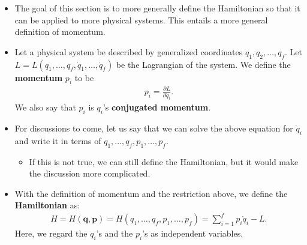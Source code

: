 \documentclass[10pt]{article}
\newcommand{\ve}[1]{\mathbf{#1}}
\begin{document}
  \begin{itemize}
    \item The goal of this section is to more generally define the Hamiltonian so that it can be applied to more physical systems. This entails a more general definition of momentum.    

    \item Let a physical system be described by generalized coordinates $q_1, q_2, \dotsc, q_f$. Let $L = L(q_1, \dotsc, q_f, \dot{q}_1, \dotsc, \dot{q}_f)$ be the Lagrangian of the system. We define the {\bf momentum} $p_i$ to be
    \begin{align} \label{momentum-def}
      p_i = \frac{\partial L}{\partial \dot{q}_i}.    
    \end{align}
    We also say that $p_i$ is $q_i$'s {\bf conjugated momentum}.

    \item For discussions to come, let us say that we can solve the above equation for $\dot{q}_i$ and write it in terms of $q_1, \dotsc, q_f, p_1, \dotsc, p_f$.
    \begin{itemize}
      \item If this is not true, we can still define the Hamiltonian, but it would make the discussion more complicated.
    \end{itemize}

    \item With the definition of momentum and the restriction above, we define the {\bf Hamiltonian} as:
    \begin{align} \label{hamiltonian-def}
      H = H(\ve{q}, \ve{p}) = H(q_1, \dotsc, q_f, p_1, \dotsc, p_f) = \sum_{i=1}^f p_i \dot{q}_i - L.    
    \end{align}
    Here, we regard the $q_i$'s and the $p_i$'s as independent variables.


\end{itemize}
\end{document}
